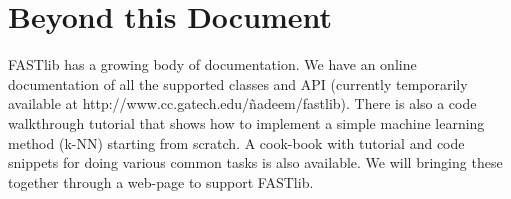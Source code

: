 \documentclass[letter]{report}
\begin{document}
\chapter {Beyond this Document} 

FASTlib has a growing body of documentation. We have an online documentation of all the supported classes and API (currently temporarily available at http://www.cc.gatech.edu/\~nadeem/fastlib). There is also a code walkthrough tutorial that shows how to implement a simple machine learning method (k-NN) starting from scratch. A cook-book with tutorial and code snippets for doing various common tasks is also available. We will bringing these together through a web-page to support FASTlib.



\end{document}
